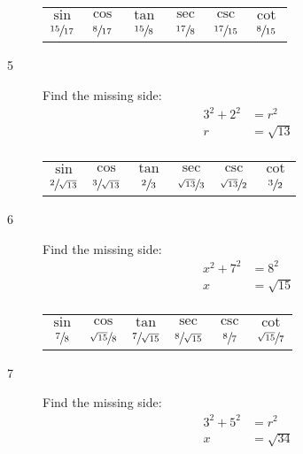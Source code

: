 \documentclass{exam}
\begin{document}
\begin{description}
        \begin{tabular}[H]{cccccc}
          \toprule
          $\sin$          & $\cos$           & $\tan$          & $\sec$           & $\csc$          & $\cot$ \\
          $\sfrac{15}{17}$ & $\sfrac{8}{17}$ & $\sfrac{15}{8}$ & $\sfrac{17}{8}$ & $\sfrac{17}{15}$ & $\sfrac{8}{15}$ \\
          \bottomrule
        \end{tabular}

      \item[5] 
        Find the missing side:
        \begin{align*}
          3^2 + 2^2 & = r^2 \\
          r         & = \sqrt{13} \\
        \end{align*}

        \begin{tabular}[H]{cccccc}
          \toprule
          $\sin$          & $\cos$           & $\tan$          & $\sec$           & $\csc$          & $\cot$ \\
          $\sfrac{2}{\sqrt{13}}$ & $\sfrac{3}{\sqrt{13}}$ & $\sfrac{2}{3}$ & $\sfrac{\sqrt{13}}{3}$ & $\sfrac{\sqrt{13}}{2}$ & $\sfrac{3}{2}$ \\
          \bottomrule
        \end{tabular}

      \item[6] 
        Find the missing side:
        \begin{align*}
          x^2 + 7^2 & = 8^2 \\
          x         & = \sqrt{15} \\
        \end{align*}

        \begin{tabular}[H]{cccccc}
          \toprule
          $\sin$          & $\cos$           & $\tan$          & $\sec$           & $\csc$          & $\cot$ \\
          $\sfrac{7}{8}$ & $\sfrac{\sqrt{15}}{8}$ & $\sfrac{7}{\sqrt{15}}$ & $\sfrac{8}{\sqrt{15}}$ & $\sfrac{8}{7}$ & $\sfrac{\sqrt{15}}{7}$ \\
          \bottomrule
        \end{tabular}

      \item[7]
        Find the missing side:
        \begin{align*}
          3^2 + 5^2 & = r^2 \\
          x         & = \sqrt{34} \\
        \end{align*}


\end{description}
\end{document}
